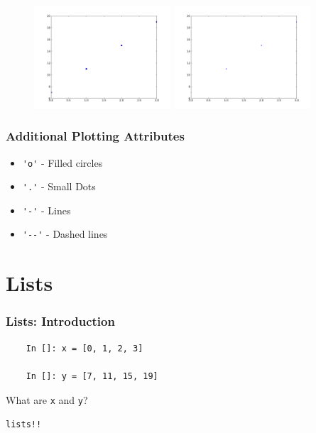 \documentclass[14pt,compress]{beamer}
\newcommand{\typ}[1]{\lstinline{#1}}
\begin{document}
\begin{frame}[fragile]
\begin{figure}
\includegraphics[width=2in]{data/stline_dots.png}
\includegraphics[width=2in]{data/stline_points.png}
\end{figure}
\end{frame}

\begin{frame}[fragile]
\frametitle{Additional Plotting Attributes}
\begin{itemize}
  \item \typ{'o'} - Filled circles
  \item \typ{'.'} - Small Dots
  \item \typ{'-'} - Lines
  \item \typ{'--'} - Dashed lines
\end{itemize}
\end{frame}

\section{Lists}
\begin{frame}[fragile]
  \frametitle{Lists: Introduction}
  \begin{lstlisting}
    In []: x = [0, 1, 2, 3]

    In []: y = [7, 11, 15, 19]

  \end{lstlisting}
What are \typ{x} and \typ{y}?\\
\begin{center}
\alert{\typ{lists!!}}
\end{center}
\end{frame}
\end{document}
